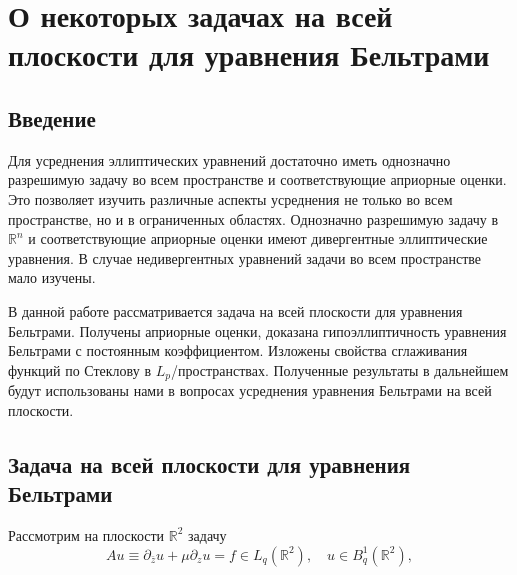 \chapter{О некоторых задачах на всей плоскости для уравнения Бельтрами}


\section{Введение}
Для усреднения эллиптических уравнений достаточно иметь однозначно разрешимую задачу во всем пространстве и соответствующие априорные оценки. Это позволяет изучить различные  аспекты усреднения не только во всем пространстве, но и в ограниченных областях. Однозначно разрешимую задачу в $\mathbb{R}^n$ и соответствующие априорные оценки имеют дивергентные эллиптические уравнения. В случае недивергентных уравнений задачи во всем пространстве мало изучены. 

В данной работе рассматривается задача на всей плоскости для уравнения Бельтрами. Получены априорные оценки, доказана гипоэллиптичность уравнения Бельтрами с постоянным коэффициентом. Изложены свойства сглаживания функций по Стеклову в $L_p$\-/пространствах. Полученные результаты в дальнейшем будут использованы нами в вопросах усреднения уравнения Бельтрами на всей плоскости.



\section{Задача на всей плоскости для уравнения Бельтрами}
	
Рассмотрим на плоскости $\mathbb{R}^2$ задачу
\begin{equation}\label{eq:smm-1}
  Au\equiv\partial_{\bar{z}}u+\mu\partial_z u=f\in L_q (\mathbb{R}^2),\quad u\in B_q^1 (\mathbb{R}^2),
\end{equation}
                                
